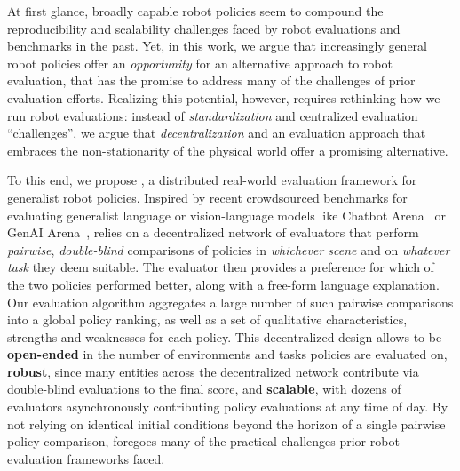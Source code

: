 At first glance, broadly capable robot policies seem to compound the reproducibility and scalability challenges faced by robot evaluations and benchmarks in the past. 
Yet, in this work, we argue that increasingly general robot policies offer an \emph{opportunity} for an alternative approach to robot evaluation, that has the promise to address many of the challenges of prior evaluation efforts. %
Realizing this potential, however, requires rethinking how we run robot evaluations: instead of \emph{standardization} and centralized evaluation ``challenges'', we argue that \emph{decentralization} and an evaluation approach that embraces the non-stationarity of the physical world offer a promising alternative. %

To this end, we propose \Acronym{}, a distributed real-world evaluation framework for generalist robot policies. Inspired by recent crowdsourced benchmarks for evaluating generalist language or vision-language models like Chatbot Arena~\citep{chiang2024chatbot} or GenAI Arena~\citep{jiang2024genai}, \Acronym{} relies on a decentralized network of evaluators that perform \emph{pairwise}, \emph{double-blind} comparisons of policies in \emph{whichever scene} and on \emph{whatever task} they deem suitable. The evaluator then provides a preference for which of the two policies performed better, along with a free-form language explanation. Our evaluation algorithm aggregates a large number of such pairwise comparisons into a global policy ranking, as well as a set of qualitative characteristics, strengths and weaknesses for each policy. This decentralized design allows \Acronym{} to be \textbf{open-ended} in the number of environments and tasks policies are evaluated on, \textbf{robust}, since many entities across the decentralized network contribute via double-blind evaluations to the final score, and \textbf{scalable}, with dozens of evaluators asynchronously contributing policy evaluations at any time of day. By not relying on identical initial conditions beyond the horizon of a single pairwise policy comparison, \Acronym{} foregoes many of the practical challenges prior robot evaluation frameworks faced.

